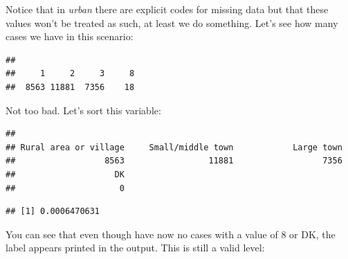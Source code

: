 \documentclass[
]{book}
\newenvironment{Shaded}{\begin{snugshade}}{\end{snugshade}}
\newcommand{\ConstantTok}[1]{\textcolor[rgb]{0.00,0.00,0.00}{#1}}
\newcommand{\DecValTok}[1]{\textcolor[rgb]{0.00,0.00,0.81}{#1}}
\newcommand{\FunctionTok}[1]{\textcolor[rgb]{0.00,0.00,0.00}{#1}}
\newcommand{\NormalTok}[1]{#1}
\newcommand{\OtherTok}[1]{\textcolor[rgb]{0.56,0.35,0.01}{#1}}
\newcommand{\SpecialCharTok}[1]{\textcolor[rgb]{0.00,0.00,0.00}{#1}}
\begin{document}
Notice that in \emph{urban} there are explicit codes for missing data but that these values won't be treated as such, at least we do something. Let's see how many cases we have in this scenario:

\begin{Shaded}
\end{Shaded}

\begin{verbatim}
## 
##     1     2     3     8 
##  8563 11881  7356    18
\end{verbatim}

Not too bad. Let's sort this variable:

\begin{Shaded}
\end{Shaded}

\begin{verbatim}
## 
## Rural area or village     Small/middle town            Large town 
##                  8563                 11881                  7356 
##                    DK 
##                     0
\end{verbatim}

\begin{Shaded}
\end{Shaded}

\begin{verbatim}
## [1] 0.0006470631
\end{verbatim}

You can see that even though have now no cases with a value of 8 or DK, the label appears printed in the output. This is still a valid level:
\end{document}
